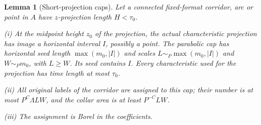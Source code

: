 \documentclass[11pt]{amsart}
\newtheorem{lemma}[theorem]{Lemma}
\theoremstyle{definition}
\theoremstyle{remark}
\numberwithin{equation}{section}
\begin{document}
\begin{lemma}[Short-projection caps]\label{geo:caps}
Let a connected fixed-format corridor, arc or point in $A$ have $z$-projection length $H<\tau_0$.

\noindent\textup{(i)} At the midpoint height $z_0$ of the projection, the actual characteristic projection has image a horizontal interval $I$, possibly a point. The parabolic cap has horizontal seed length $\max(m_0,|I|)$ and scales $L\sim_P\max(m_0,|I|)$ and $W\sim_Pm_0$, with $L\ge W$. Its seed contains $I$. Every characteristic used for the projection has time length at most $\tau_0$.

\noindent\textup{(ii)} All original labels of the corridor are assigned to this cap; their number is at most $P^C\Lambda LW$, and the collar area is at least $P^{-C}LW$.

\noindent\textup{(iii)} The assignment is Borel in the coefficients.
\end{lemma}
\end{document}
